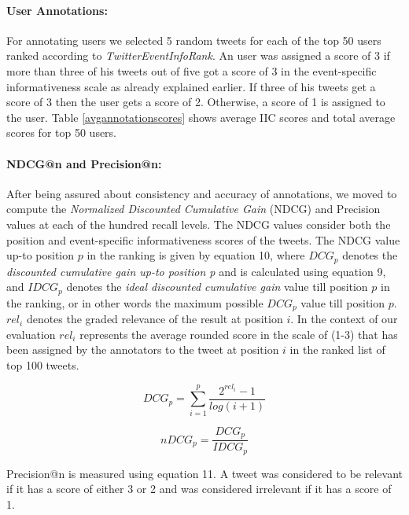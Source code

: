 \paragraph{User Annotations:} For annotating users we selected 5 random tweets for each of the top 50 users ranked according to \textit{TwitterEventInfoRank}. An user was assigned a score of 3 if more than three of his tweets out of five got a score of 3 in the event-specific informativeness scale as already explained earlier. If three of his tweets get a score of 3 then the user gets a score of 2. Otherwise, a score of 1 is assigned to the user. Table \ref{avgannotationscores} shows average IIC scores and total average scores for top 50 users.

 
\paragraph{NDCG@n and Precision@n:} After being assured about consistency and accuracy of annotations, we moved to compute the \textit{Normalized Discounted Cumulative Gain} (NDCG) \cite{jarvelin2002cumulated} and Precision \cite{baeza1999modern} values at each of the hundred recall levels. The NDCG values consider both the position and event-specific informativeness scores of the tweets. The NDCG value up-to position $\scriptstyle p$ in the ranking is given by equation 10, where $\scriptstyle DCG_{p}$ denotes the \textit{discounted cumulative gain up-to position p} and is calculated using equation 9, and $\scriptstyle IDCG_{p}$ denotes the \textit{ideal discounted cumulative gain} value till position $\scriptstyle p$ in the ranking, or in other words the maximum possible $\scriptstyle DCG_{p}$ value till position $\scriptstyle p$. $\scriptstyle rel_{i}$ denotes the graded relevance of the result at position $\scriptstyle i$. In the context of our evaluation $\scriptstyle rel_{i}$ represents the average rounded score in the scale of (1-3) that has been assigned by the annotators to the tweet at position  $\scriptstyle i$ in the ranked list of top 100 tweets.

\begin{equation}
DCG_{p} = \sum_{i=1}^{p}\frac{2^{rel_{i}}-1}{log(i+1)}
\end{equation}

\begin{equation}
nDCG_{p} = \frac{DCG_{p}}{IDCG_{p}} 
\end{equation}

Precision@n is measured using equation 11. A tweet was considered to be relevant if it has a score of either 3 or 2 and was considered irrelevant if it has a score of 1.

